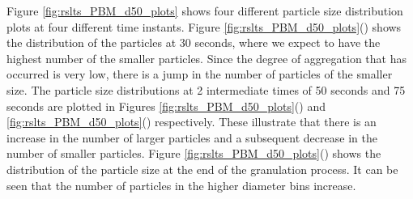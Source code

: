 \documentclass[preprint,11pt,authoryear]{elsarticle}
\begin{document}
Figure \ref{fig:rslts_PBM_d50_plots} shows four different particle size distribution plots at four 
different time instants. Figure \ref{fig:rslts_PBM_d50_plots}() shows the distribution of 
the particles at 30 seconds, where we expect to have the highest number of the smaller particles. 
Since the degree of aggregation that has occurred is very low, there is a jump in the number of 
particles of the smaller size. The particle size distributions at 2 intermediate times of 50 seconds and 
75 seconds are plotted in Figures \ref{fig:rslts_PBM_d50_plots}() and 
\ref{fig:rslts_PBM_d50_plots}() respectively. These illustrate that there is an increase in 
the number of larger particles  and a subsequent decrease in the number of smaller particles. 
Figure \ref{fig:rslts_PBM_d50_plots}() shows the distribution 
of the particle size at the end of the granulation process. It can be seen that the number of particles in 
the higher diameter bins increase.
\end{document}
